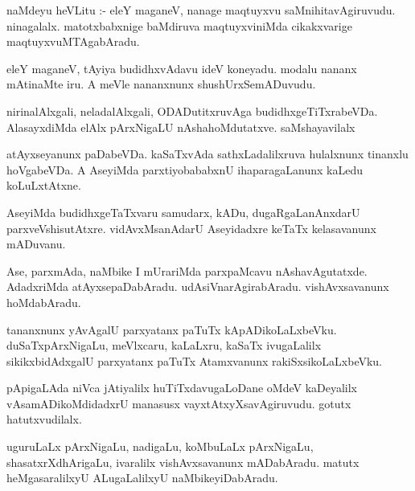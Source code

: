 \documentclass{article}
\begin{document}
\begin{mn}
naMdeyu  heVLitu :- eleY  maganeV,  nanage  maqtuyxvu  saMnihitavAgiruvudu.  ninagalalx.  
matotxbabxnige  baMdiruva  maqtuyxviniMda  cikakxvarige  maqtuyxvuMTAgabAradu.
\end{mn}

\begin{mn}
eleY  maganeV,  tAyiya  budidhxvAdavu  ideV  koneyadu.  modalu  nananx  
mAtinaMte  iru.  A meVle  nananxnunx  shushUrxSemADuvudu.
\end{mn}

\begin{mn}
nirinalAlxgali,  neladalAlxgali, ODADutitxruvAga  budidhxgeTiTxrabeVDa.  
AlasayxdiMda  elAlx  pArxNigaLU  nAshahoMdutatxve.  saMshayavilalx
\end{mn}

\begin{mn}
atAyxseyanunx  paDabeVDa.  kaSaTxvAda  sathxLadalilxruva  hulalxnunx  tinanxlu  
hoVgabeVDa.  A AseyiMda  parxtiyobababxnU  ihaparagaLanunx  kaLedu  koLuLxtAtxne.
\end{mn}

\begin{mn}
AseyiMda  budidhxgeTaTxvaru  samudarx,  kADu,  dugaRgaLanAnxdarU  parxveVshisutAtxre.  
vidAvxMsanAdarU  Aseyidadxre  keTaTx kelasavanunx  mADuvanu. 
\end{mn}

\begin{mn}
Ase,   parxmAda,  naMbike  I  mUrariMda  parxpaMcavu nAshavAgutatxde.  AdadxriMda  
atAyxsepaDabAradu.  udAsiVnarAgirabAradu.  vishAvxsavanunx  hoMdabAradu.
\end{mn}

\begin{mn}
tananxnunx  yAvAgalU  parxyatanx paTuTx  kApADikoLaLxbeVku.  duSaTxpArxNigaLu,  meVlxcaru,  
kaLaLxru,  kaSaTx ivugaLalilx  sikikxbidAdxgalU  parxyatanx  paTuTx  Atamxvanunx  rakiSxsikoLaLxbeVku. 
\end{mn}

\begin{mn}
pApigaLAda niVca jAtiyalilx  huTiTxdavugaLoDane  oMdeV  kaDeyalilx  vAsamADikoMdidadxrU  
manasusx  vayxtAtxyXsavAgiruvudu.  gotutx hatutxvudilalx.
\end{mn}

\begin{mn}
uguruLaLx  pArxNigaLu, nadigaLu,  koMbuLaLx  pArxNigaLu,  shasatxrXdhArigaLu,  ivaralilx  
vishAvxsavanunx  mADabAradu.  matutx  heMgasaralilxyU  ALugaLalilxyU  naMbikeyiDabAradu.
\end{mn}
\end{document}
